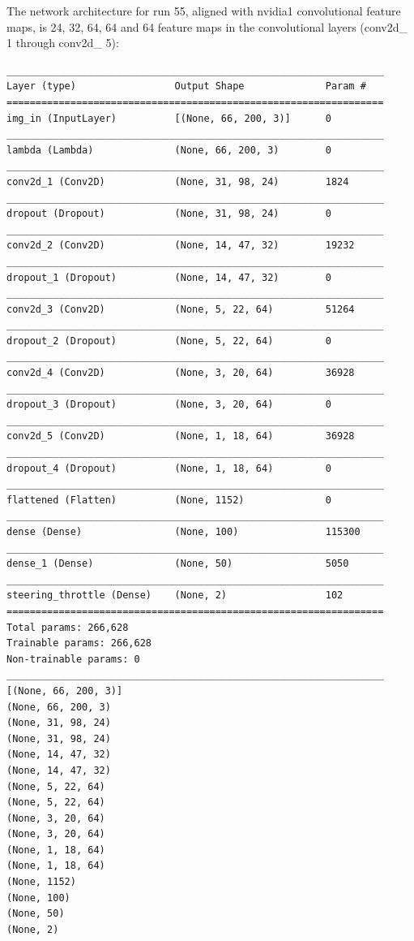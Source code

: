 The network architecture for run 55, aligned with nvidia1 convolutional feature maps, is 24, 32, 64, 64 and 64 feature maps in the convolutional layers (conv2d\_ 1 through conv2d\_ 5):

\begin{verbatim}
_________________________________________________________________
Layer (type)                 Output Shape              Param #   
=================================================================
img_in (InputLayer)          [(None, 66, 200, 3)]      0         
_________________________________________________________________
lambda (Lambda)              (None, 66, 200, 3)        0         
_________________________________________________________________
conv2d_1 (Conv2D)            (None, 31, 98, 24)        1824      
_________________________________________________________________
dropout (Dropout)            (None, 31, 98, 24)        0         
_________________________________________________________________
conv2d_2 (Conv2D)            (None, 14, 47, 32)        19232     
_________________________________________________________________
dropout_1 (Dropout)          (None, 14, 47, 32)        0         
_________________________________________________________________
conv2d_3 (Conv2D)            (None, 5, 22, 64)         51264     
_________________________________________________________________
dropout_2 (Dropout)          (None, 5, 22, 64)         0         
_________________________________________________________________
conv2d_4 (Conv2D)            (None, 3, 20, 64)         36928     
_________________________________________________________________
dropout_3 (Dropout)          (None, 3, 20, 64)         0         
_________________________________________________________________
conv2d_5 (Conv2D)            (None, 1, 18, 64)         36928     
_________________________________________________________________
dropout_4 (Dropout)          (None, 1, 18, 64)         0         
_________________________________________________________________
flattened (Flatten)          (None, 1152)              0         
_________________________________________________________________
dense (Dense)                (None, 100)               115300    
_________________________________________________________________
dense_1 (Dense)              (None, 50)                5050      
_________________________________________________________________
steering_throttle (Dense)    (None, 2)                 102       
=================================================================
Total params: 266,628
Trainable params: 266,628
Non-trainable params: 0
_________________________________________________________________
[(None, 66, 200, 3)]
(None, 66, 200, 3)
(None, 31, 98, 24)
(None, 31, 98, 24)
(None, 14, 47, 32)
(None, 14, 47, 32)
(None, 5, 22, 64)
(None, 5, 22, 64)
(None, 3, 20, 64)
(None, 3, 20, 64)
(None, 1, 18, 64)
(None, 1, 18, 64)
(None, 1152)
(None, 100)
(None, 50)
(None, 2)    
\end{verbatim}

